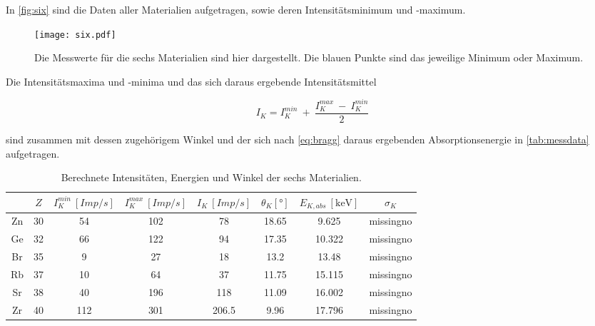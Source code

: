 In \autoref{fig:six} sind die Daten aller Materialien aufgetragen, sowie deren Intensitätsminimum und -maximum.

\begin{figure}[htbp]
  \centering
  \texttt{[image: six.pdf]}
  \caption{Die Messwerte für die sechs Materialien sind hier dargestellt. Die blauen Punkte sind das jeweilige Minimum oder Maximum.}
  \label{fig:six}
\end{figure}

Die Intensitätsmaxima und -minima und das sich daraus ergebende Intensitätsmittel 

\begin{equation}
  I_K = I_K^{min}\ +\ \frac{I_K^{max}\ -\ I_K^{min}}{2}
\end{equation}

sind zusammen mit dessen zugehörigem Winkel und der sich nach \autoref{eq:bragg} daraus ergebenden Absorptionsenergie in \autoref{tab:messdata} aufgetragen.

\begin{table}
  \centering
  \caption{Berechnete Intensitäten, Energien und Winkel der sechs Materialien.}
  \begin{tabular}{c c c c c c c c}
    \toprule
    $ $ & $Z$ & $I_K^{min}\ [Imp/s]$ & $I_K^{max}\ [Imp/s]$ & $I_K\ [Imp/s]$ & $\theta_K[\si{\degree}]$ & $E_{K,abs}\ [\si{\kilo\electronvolt}]$ & $\sigma_K$\\
    \midrule
    Zn & 30 & 54 & 102 & 78 & 18.65 & 9.625 & missingno\\ \hline
    Ge & 32 & 66 & 122 & 94 & 17.35 & 10.322 & missingno\\ \hline
    Br & 35 & 9 & 27 & 18 & 13.2 & 13.48 & missingno\\ \hline
    Rb & 37 & 10 & 64 & 37 & 11.75 & 15.115 & missingno\\ \hline
    Sr & 38 & 40 & 196 & 118 & 11.09 & 16.002 & missingno\\ \hline
    Zr & 40 & 112 & 301 & 206.5 & 9.96 & 17.796 & missingno\\
    \bottomrule
  \end{tabular}
  \label{tab:messdata}
\end{table}
